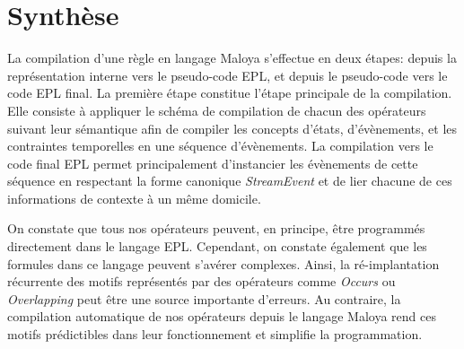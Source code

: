 \section{Synthèse}
La compilation d'une règle en langage Maloya s'effectue en deux étapes: depuis la représentation interne vers le pseudo-code EPL, et depuis le pseudo-code vers le code EPL final. 
La première étape constitue l'étape principale de la compilation. Elle consiste à appliquer le schéma de compilation de chacun des opérateurs suivant leur sémantique afin de compiler les concepts d'états, d'évènements, et les contraintes temporelles en une séquence d'évènements. 
La compilation vers le code final EPL permet principalement d'instancier les évènements de cette séquence en respectant la forme canonique {\em StreamEvent} et de lier chacune de ces informations de contexte à un même domicile.

On constate que tous nos opérateurs peuvent, en principe, être programmés directement dans le langage EPL. Cependant, on constate également que les formules dans ce langage peuvent s'avérer complexes. Ainsi, la ré-implantation récurrente des motifs représentés par des opérateurs comme {\em Occurs} ou {\em Overlapping} peut être une source importante d'erreurs. Au contraire, la compilation automatique de nos opérateurs depuis le langage Maloya rend ces motifs prédictibles dans leur fonctionnement et simplifie la programmation.

